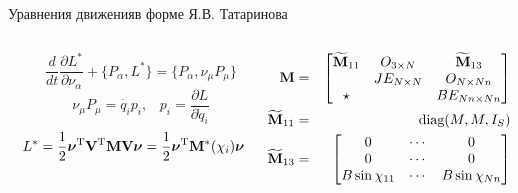 \documentclass{beamer}
\renewcommand{\vec}[1]{\boldsymbol{\mathbf{#1}}}
\begin{document}
\begin{frame}{Уравнения движения}{в форме Я.В. Татаринова}
    \begin{columns}
        \hspace{-4pt}
        \begin{column}{0.4\textwidth}
            \vspace{-40pt}
            \begin{equation*}
            \qquad
            \frac{d}{dt}\frac{\partial L^{*}}{\partial \nu_\alpha}  + \{P_\alpha, L^{*}\} = \{P_\alpha, \nu_\mu P_\mu\}
            \end{equation*}
            $$
            \qquad
            \nu_\mu P_\mu = \dot{q_i} p_i, \hspace{10pt} p_i = \frac{\partial L}{\partial \dot{q}_i}
            $$
            \vspace{20pt}
            $$
            \quad
            L^{*}  = \ddfrac{1}{2}\vec{\nu}^\mathrm{T} \cstr^\mathrm{T}\mke \cstr\vec{\nu} = \ddfrac{1}{2}\vec{\nu}^\mathrm{T} \mke^*(\chi_i)\vec{\nu}
            $$
        \end{column}
        \hspace{46pt}
        \begin{column}{0.6\textwidth}
            \vspace{-20pt}
            \begin{eqnarray*}
                \mathbf{M} & = &
                    \begin{bmatrix}
                        \widetilde{\mathbf{M}}_{11} & O_{3 \times N}  & \widetilde{\mathbf{M}}_{13} \\
                                            & JE_{N \times N} & O_{N \times Nn}     \\
                        \star               &                 & BE_{Nn \times Nn}   \\
                    \end{bmatrix} \\
                \widetilde{\mathbf{M}}_{11} & = & \text{diag}(M, M, I_S) \\
                \widetilde{\mathbf{M}}_{13} & = &
                    \begin{bmatrix}
                        0                      & \cdots & 0                      \\
                        0                      & \cdots & 0                      \\
                        B\sin\chi_{11}         & \cdots & B\sin\chi_{Nn}         \\

\end{bmatrix}
\end{eqnarray*}
\end{column}
\end{columns}
\end{frame}
\end{document}
